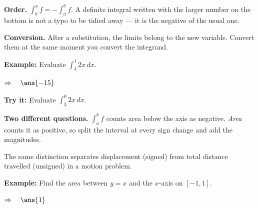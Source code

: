 \documentclass[12pt]{article}
\begin{document}


\begin{formulabox}
\textbf{Order.} $\displaystyle\int_b^a f = -\int_a^b f$. A definite integral
written with the larger number on the bottom is not a typo to be tidied away ---
it is the negative of the usual one.\par
\textbf{Conversion.} After a substitution, the limits belong to the new
variable. Convert them at the same moment you convert the integrand.
\end{formulabox}

\begin{examplebox}
\textbf{Example:} \quad Evaluate $\displaystyle\int_4^1 2x\,dx$.

$\Rightarrow\quad \ans{-15}$
\end{examplebox}

\begin{tryitbox}
\textbf{Try it:} \quad Evaluate $\displaystyle\int_3^0 2x\,dx$.\\[2pt]
\end{tryitbox}


\begin{formulabox}
\textbf{Two different questions.} $\displaystyle\int_a^b f$ counts area below
the axis as negative. \emph{Area} counts it as positive, so split the interval
at every sign change and add the magnitudes.\par
The same distinction separates displacement (signed) from total distance
travelled (unsigned) in a motion problem.
\end{formulabox}

\begin{examplebox}
\textbf{Example:} \quad Find the area between $y = x$ and the $x$-axis on
$[-1, 1]$.

$\Rightarrow\quad \ans{1}$
\end{examplebox}
\end{document}
